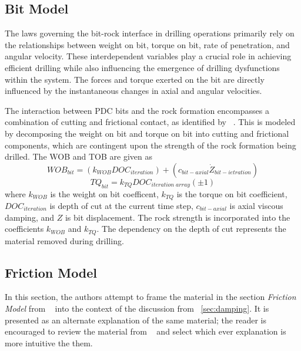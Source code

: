\subsection{Bit Model}
\label{sec:exxonbitmodel}
The laws governing the bit-rock interface in drilling operations primarily rely on the relationships between weight on bit, torque on bit, rate of penetration, and angular velocity. These interdependent variables play a crucial role in achieving efficient drilling while also influencing the emergence of drilling dysfunctions within the system. The forces and torque exerted on the bit are directly influenced by the instantaneous changes in axial and angular velocities.

The interaction between PDC bits and the rock formation encompasses a combination of cutting and frictional contact, as identified by ~\cite{ref:detournay1992a}.   This is modeled by decomposing the weight on bit and torque on bit into cutting and frictional components, which are contingent upon the strength of the rock formation being drilled.  The WOB and TOB are given as
\begin{equation}\label{WOB}
  WOB_{bit} = (k_{WOB} DOC_{iteration}) + (c_{bit-axial} \dot{Z}_{bit-ietration})
\end{equation}
\begin{equation}\label{Torque}
  TQ_{bit} = k_{TQ} DOC_{iteration\; array} (\pm1)
\end{equation}
where $k_{WOB}$ is the weight on bit coefficent, $k_{TQ}$ is the torque on bit coefficient, $DOC_{iteration}$ is depth of cut at the current time step, $c_{bit-axial}$ is axial viscous damping, and $Z$ is bit displacement.  The rock strength is incorporated into the coefficients $k_{WOB}$ and $k_{TQ}$.  The dependency on the depth of cut represents the material removed during drilling.

\subsection{Friction Model}
\label{sec:exxonfrictionmodel}
In this section, the authors attempt to frame the material in the section \emph{Friction Model} from ~\cite{ref:dixit2021a} into the context of the discussion from \sectionname~\ref{sec:damping}.  It is presented as an alternate explanation of the same material; the reader is encouraged to review the material from ~\cite{ref:dixit2021a} and select which ever explanation is more intuitive the them.


